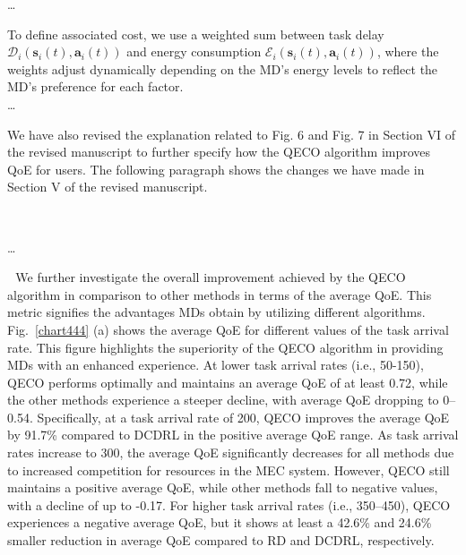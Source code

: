 \documentclass[12pt,draftclsnofoot,onecolumn]{IEEEtran}
\newcommand{\rev}[1]{{\color{blue}#1}} %
\newcommand{\rev}[1]{#1}
\newenvironment{my}[2]%
{\begin{list}{}%
{\setlength{\rightmargin}{#1}\setlength{\leftmargin}{#2}}%


 \item[]{}

} {\end{list}}
\begin{document}
\begin{enumerate}
\begin{my}{1cm}{1cm}
{{				\dots
								
				To define associated cost, we use a weighted sum between task delay $\mathcal{D}_i(\boldsymbol{s}_i(t),\boldsymbol{a}_i(t))$ and energy consumption $\mathcal{E}_i(\boldsymbol{s}_i(t),\boldsymbol{a}_i(t))$, where the weights adjust dynamically depending on the MD's energy levels to reflect the MD's preference for each factor. \\\dots
}}
	\end{my}\vspace{6mm}

We have also revised the explanation related to Fig. 6 and Fig. 7 in Section VI of the revised manuscript to further specify how the QECO algorithm improves QoE for users. The following paragraph shows the changes we have made in Section V of the revised manuscript.
\begin{my}{1cm}{1cm}
	\rev{
		{\ 
			
			\dots 
			
			\,\,\,\,We further investigate the overall improvement achieved by the QECO algorithm in comparison to other methods in terms of the average QoE. This metric signifies the advantages MDs obtain by utilizing different algorithms. Fig.~\ref{chart444} (a) shows the average QoE for different values of the task arrival rate. This figure highlights the superiority of the QECO algorithm in providing MDs with an enhanced experience. At lower task arrival rates (i.e., 50-150), QECO performs optimally and maintains an average QoE of at least 0.72, while the other methods experience a steeper decline, with average QoE dropping to 0--0.54. Specifically, at a task arrival rate of 200, QECO improves the average QoE by 91.7\% compared to DCDRL in the positive average QoE range. As task arrival rates increase to 300, the average QoE significantly decreases for all methods due to increased competition for resources in the MEC system. However, QECO still maintains a positive average QoE, while other methods fall to negative values, with a decline of up to -0.17. For higher task arrival rates (i.e., 350–450), QECO experiences a negative average QoE, but it shows at least a 42.6\% and 24.6\% smaller reduction in average QoE compared to RD and DCDRL, respectively. \vspace{3mm}
			
			
			
}}
\end{my}
\end{enumerate}
\end{document}
